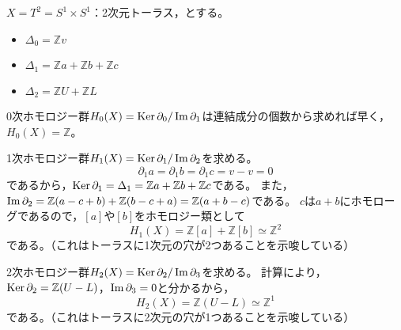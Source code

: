 \documentclass[uplatex]{jsarticle}
\begin{document}
\begin{rei}[トーラスのホモロジー群]
	$X = T^{2} = S^{1} \times S^{1}$：2次元トーラス，とする。
	\begin{center}
	\end{center}
	\begin{itemize}
		\vspace{-0.5\baselineskip}
		\item $\Delta_{0} = \mathbb{Z} v$
		\item $\Delta_{1} = \mathbb{Z} a + \mathbb{Z} b + \mathbb{Z} c$
		\item $\Delta_{2} = \mathbb{Z} U + \mathbb{Z} L$
	\end{itemize}

	0次ホモロジー群$H_{0}(X) = \operatorname{Ker} \partial_{0} / \operatorname{Im} \partial_{1}$は連結成分の個数から求めれば早く，$H_{0}(X) = \mathbb{Z}$。

	1次ホモロジー群$H_{1}(X) = \operatorname{Ker} \partial_{1} / \operatorname{Im} \partial_{2}$を求める。
	\begin{equation}
		\partial_{1} a = \partial_{1} b = \partial_{1} c = v - v = 0
	\end{equation}
	であるから，$\operatorname{Ker} \partial_{1} = \Delta_{1} = \mathbb{Z} a + \mathbb{Z} b + \mathbb{Z} c$である。
	また，$\operatorname{Im} \partial_{2} = \mathbb{Z} (a-c+b) + \mathbb{Z} (b-c+a) = \mathbb{Z} (a+b-c)$である。
	$c$は$a+b$にホモローグであるので，$[a]$や$[b]$をホモロジー類として
	\begin{equation}
		H_{1}(X) = \mathbb{Z} [a] + \mathbb{Z} [b] \simeq \mathbb{Z}^{2}
	\end{equation}
	である。（これはトーラスに1次元の穴が2つあることを示唆している）

	2次ホモロジー群$H_{2}(X) = \operatorname{Ker} \partial_{2} / \operatorname{Im} \partial_{3}$を求める。
	計算により，$\operatorname{Ker} \partial_{2} = \mathbb{Z} (U-L)$，$\operatorname{Im} \partial_{3} = 0$と分かるから，
	\begin{equation}
		H_{2}(X) = \mathbb{Z} (U-L) \simeq \mathbb{Z}^{1}
	\end{equation}
	である。（これはトーラスに2次元の穴が1つあることを示唆している）


\end{rei}
\end{document}
